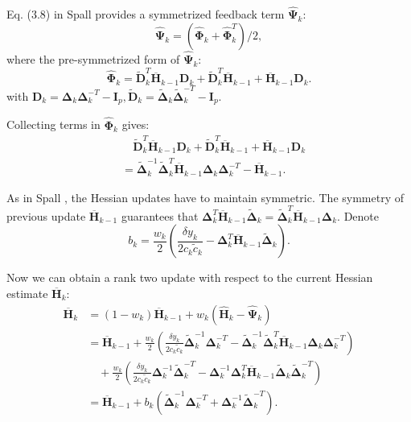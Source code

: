 \documentclass[conference]{IEEEtran}
\newcommand{\bD}{\bm{D}}
\newcommand{\bI}{\bm{I}}
\newcommand{\bDelta}{\bm{\Delta}}
\newcommand{\oH}{\bm{\overline{H}}}
\newcommand{\hH}{\bm{\hat{H}}}
\newcommand{\hPsi}{\bm{\hat{\Psi}}}
\newcommand{\hPhi}{\bm{\hat{\Phi}}}
\newcommand{\tDelta}{\bm{\tilde{\Delta}}}
\newcommand{\tD}{\bm{\tilde{D}}}
\begin{document}
	Eq. (3.8) in Spall \cite{Spall2009} provides a symmetrized feedback term $ \hPsi_k $:
	\begin{equation} \label{eq:PsiHat}
			\hPsi_k =(\hPhi_k+\hPhi_k^T)/2,
	\end{equation}
	where the pre-symmetrized form of $ \hPsi_k $:
	\begin{equation}
		\hPhi_k=\tD_k^T\oH_{k-1}\bD_k+\tD_k^T\oH_{k-1}+\oH_{k-1}\bD_k.
	\end{equation}
	with $ \bD_k=\bDelta_k\bDelta_k^{-T}-\bI_p, \tD_k=\tDelta_k\tDelta_k^{-T}-\bI_p $.
	
	Collecting terms in $\hPhi_k$ gives:
	\begin{align*}
		&\quad\tD_k^T\oH_{k-1}\bD_k+\tD_k^T\oH_{k-1}+\oH_{k-1}\bD_k\\
		&=\tDelta_k^{-1}\tDelta_k^{T}\oH_{k-1}\bDelta_k\bDelta_k^{-T}-\oH_{k-1}.
	\end{align*}
	
	As in Spall \cite{Spall2009}, the Hessian updates have to maintain symmetric. The symmetry of previous update $ \oH_{k-1}$ guarantees that $\bDelta_k^{T}\oH_{k-1}\tDelta_k=\tDelta_k^{T}\oH_{k-1}\bDelta_k$. Denote
	\begin{equation}
		b_k=\frac{w_k}{2}(\frac{\delta y_k}{2c_k\tilde{c}_k}-\bDelta_k^{T}\oH_{k-1}\tDelta_k).
	\end{equation}
	

	Now we can obtain a rank two update with respect to
	the current Hessian estimate $\oH_k$:
	\begin{align*}
		\oH_k&=(1-w_k)\oH_{k-1}+w_k(\hH_k-\hPsi_k)\\
		&=\oH_{k-1}+\frac{w_k}{2}(\frac{\delta y_k}{2c_k\tilde{c}_k}\tDelta_k^{-1}\bDelta_k^{-T}-\tDelta_k^{-1}\tDelta_k^{T}\oH_{k-1}\bDelta_k\bDelta_k^{-T})\\
		&\quad +\frac{w_k}{2}(\frac{\delta y_k}{2c_k\tilde{c}_k}\bDelta_k^{-1}\tDelta_k^{-T}-\bDelta_k^{-1}\bDelta_k^{T}\oH_{k-1}\tDelta_k\tDelta_k^{-T})\\
		&=\oH_{k-1}+b_k(\tDelta_k^{-1}\bDelta_k^{-T}+\bDelta_k^{-1}\tDelta_k^{-T}).
	\end{align*}
			
\end{document}
